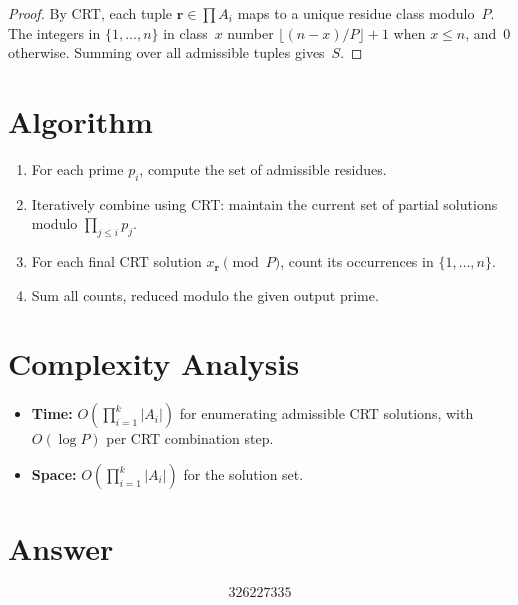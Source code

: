 \documentclass[11pt]{article}
\begin{document}
\begin{proof}
By CRT, each tuple $\mathbf{r} \in \prod A_i$ maps to a unique residue class modulo~$P$. The integers in $\{1, \ldots, n\}$ in class~$x$ number $\lfloor(n - x)/P\rfloor + 1$ when $x \leq n$, and~0 otherwise. Summing over all admissible tuples gives~$S$.
\end{proof}

\section{Algorithm}

\begin{enumerate}
\item For each prime $p_i$, compute the set of admissible residues.
\item Iteratively combine using CRT: maintain the current set of partial solutions modulo $\prod_{j \leq i} p_j$.
\item For each final CRT solution $x_{\mathbf{r}} \pmod{P}$, count its occurrences in $\{1, \ldots, n\}$.
\item Sum all counts, reduced modulo the given output prime.
\end{enumerate}

\section{Complexity Analysis}

\begin{itemize}
\item \textbf{Time:} $O\!\left(\prod_{i=1}^k |A_i|\right)$ for enumerating admissible CRT solutions, with $O(\log P)$ per CRT combination step.
\item \textbf{Space:} $O\!\left(\prod_{i=1}^k |A_i|\right)$ for the solution set.
\end{itemize}

\section{Answer}

\[
\boxed{326227335}
\]
\end{document}
